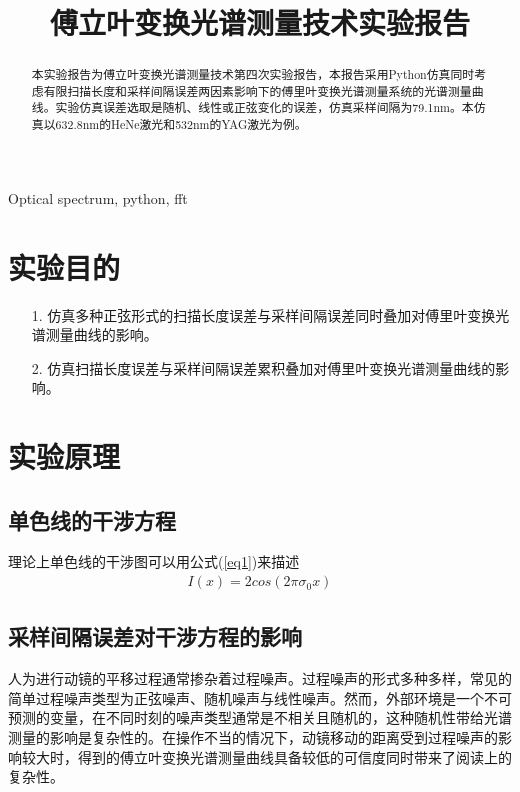 \documentclass[conference]{IEEEtran}
\begin{document}
\title{傅立叶变换光谱测量技术实验报告}

\author{
}
\maketitle

\begin{abstract}
    本实验报告为傅立叶变换光谱测量技术第四次实验报告，本报告采用Python仿真同时考虑有限扫描长度和采样间隔误差两因素影响下的傅里叶变换光谱测量系统的光谱测量曲线。实验仿真误差选取是随机、线性或正弦变化的误差，仿真采样间隔为79.1nm。本仿真以632.8nm的HeNe激光和532nm的YAG激光为例。
\end{abstract}

\begin{IEEEkeywords}
    Optical spectrum, python, fft
\end{IEEEkeywords}

\section{实验目的}
\begin{itemize}
    \item[1.] 仿真多种正弦形式的扫描长度误差与采样间隔误差同时叠加对傅里叶变换光谱测量曲线的影响。
    \item[2.] 仿真扫描长度误差与采样间隔误差累积叠加对傅里叶变换光谱测量曲线的影响。
\end{itemize} 

\section{实验原理}
\subsection{单色线的干涉方程}
理论上单色线的干涉图可以用公式(\ref{eq1})来描述
\begin{align}
    I(x) = 2cos(2\pi \sigma_0 x)    \label{eq1}
\end{align}

\subsection{采样间隔误差对干涉方程的影响}
人为进行动镜的平移过程通常掺杂着过程噪声。过程噪声的形式多种多样，常见的简单过程噪声类型为正弦噪声、随机噪声与线性噪声。然而，外部环境是一个不可预测的变量，在不同时刻的噪声类型通常是不相关且随机的，这种随机性带给光谱测量的影响是复杂性的。在操作不当的情况下，动镜移动的距离受到过程噪声的影响较大时，得到的傅立叶变换光谱测量曲线具备较低的可信度同时带来了阅读上的复杂性。
\end{document}
